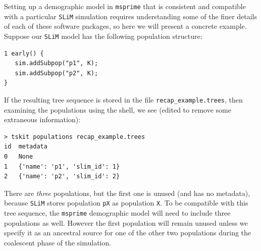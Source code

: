 \documentclass[12pt]{article}
\newcommand{\msprime}[0]{\texttt{msprime}\xspace}
\newcommand{\slim}[0]{\texttt{SLiM}\xspace}
\begin{document}
Setting up a demographic model in \msprime that is consistent and compatible with a particular \slim simulation requires
understanding some of the finer details of each of these software packages, so here we will present a concrete example.
Suppose our \slim model has the following population structure:
\begin{verbatim}
1 early() {
   sim.addSubpop("p1", K);
   sim.addSubpop("p2", K);
}
\end{verbatim}
If the resulting tree sequence is stored in the file \texttt{recap\_example.trees},
then examining the populations using the shell, we see
(edited to remove some extraneous information):
\begin{verbatim}
> tskit populations recap_example.trees
id	metadata
0	None
1	{'name': 'p1', 'slim_id': 1}
2	{'name': 'p2', 'slim_id': 2}
\end{verbatim}
There are \emph{three} populations, but the first one is unused (and has no metadata),
because \slim stores population \texttt{pX} as population \texttt{X}.
To be compatible with this tree sequence, the \msprime demographic model will need to include three populations as well.
However the first population will remain unused unless we specify it as an ancestral source for
one of the other two populations during the coalescent phase of the simulation.
\end{document}
